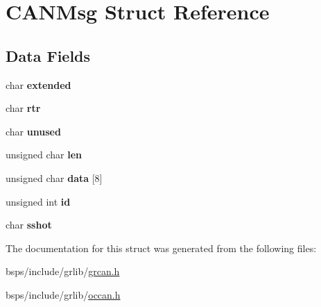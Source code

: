 \hypertarget{structCANMsg}{}\section{C\+A\+N\+Msg Struct Reference}
\label{structCANMsg}
\subsection*{Data Fields}
\begin{DoxyCompactItemize}
\item 
\mbox{\label{structCANMsg_a094a7c7e39c618cb360fbc3eeb4d9939}} 
char {\bfseries extended}
\item 
\mbox{\label{structCANMsg_a145089d372d5f4de4c99a3ea934e0fc8}} 
char {\bfseries rtr}
\item 
\mbox{\label{structCANMsg_aeb2ec998c006d6681311e5afa8738940}} 
char {\bfseries unused}
\item 
\mbox{\label{structCANMsg_a98c94f070c36c5a01df1b6f123ca6277}} 
unsigned char {\bfseries len}
\item 
\mbox{\label{structCANMsg_a57b977f53f6486bf838d907b28acd4c9}} 
unsigned char {\bfseries data} \mbox{[}8\mbox{]}
\item 
\mbox{\label{structCANMsg_a8a281ac28b0d76ef1de4830770ccdf15}} 
unsigned int {\bfseries id}
\item 
\mbox{\label{structCANMsg_aa9736b9b1d645c337d75cea7c64fbe37}} 
char {\bfseries sshot}
\end{DoxyCompactItemize}


The documentation for this struct was generated from the following files\+:\begin{DoxyCompactItemize}
\item 
bsps/include/grlib/\mbox{\hyperlink{grcan_8h}{grcan.\+h}}\item 
bsps/include/grlib/\mbox{\hyperlink{occan_8h}{occan.\+h}}\end{DoxyCompactItemize}
